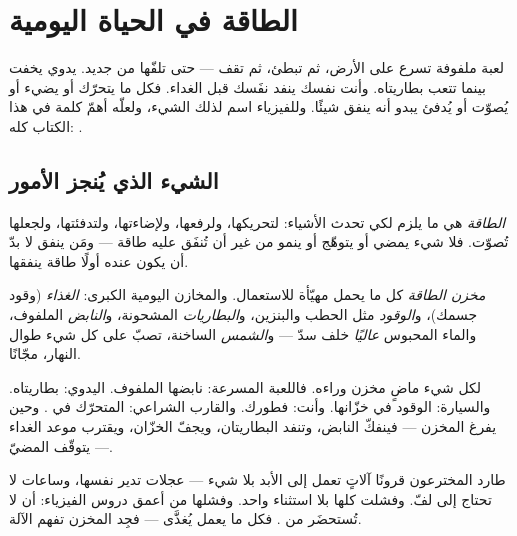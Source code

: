 \chapter{الطاقة في الحياة اليومية}\label{ch:g5:everyday-energy}

لعبة ملفوفة تسرع على الأرض، ثم تبطئ، ثم تقف --- حتى تلفّها من
جديد.  يدوي يخفت بينما تتعب بطاريتاه. وأنت نفسك ينفد نفَسك
قبل الغداء. فكل ما يتحرّك أو يضيء أو يُصوّت أو يُدفئ يبدو أنه
ينفق شيئًا. وللفيزياء اسم لذلك الشيء، ولعلّه أهمّ كلمة في هذا
الكتاب كله: .

\section{الشيء الذي يُنجز الأمور}

\begin{definition}[الطاقة]\label{def:g5:everyday-energy:energy}
\emph{الطاقة} هي ما يلزم لكي تحدث الأشياء: لتحريكها،
ولرفعها، ولإضاءتها، ولتدفئتها، ولجعلها تُصوّت. فلا شيء يمضي أو
يتوهّج أو ينمو من غير أن تُنفَق عليه طاقة --- ومَن ينفق لا بدّ
أن يكون عنده أولًا طاقة ينفقها.
\end{definition}

\begin{definition}\label{def:g5:everyday-energy:store}
\emph{مخزن الطاقة} كل ما يحمل  مهيّأة
للاستعمال. والمخازن اليومية الكبرى: \emph{الغذاء} (وقود جسمك)،
و\emph{الوقود} مثل الحطب والبنزين، و\emph{البطاريات} المشحونة،
و\emph{النابض} الملفوف، والماء المحبوس \emph{عاليًا} خلف سدّ ---
و\emph{الشمس} الساخنة، تصبّ  على كل شيء طوال النهار،
مجّانًا.
\end{definition}

\begin{example}\label{ex:g5:everyday-energy:spot}
لكل شيء ماضٍ مخزن وراءه. فاللعبة المسرعة: نابضها الملفوف.
 اليدوي: بطاريتاه. والسيارة: الوقود في خزّانها. وأنت:
فطورك. والقارب الشراعي:  المتحرّك في . وحين يفرغ
المخزن --- فينفكّ النابض، وتنفد البطاريتان، ويجفّ الخزّان،
ويقترب موعد الغداء --- يتوقّف المضيّ.
\end{example}

\begin{remark}\label{rem:g5:everyday-energy:nofree}
طارد المخترعون قرونًا آلاتٍ تعمل إلى الأبد بلا شيء --- عجلات
تدير نفسها، وساعات لا تحتاج إلى لفّ. وفشلت كلها بلا استثناء
واحد. وفشلها من أعمق دروس الفيزياء: أن  لا تُستحضَر من
. فكل ما يعمل يُغذَّى --- فجِد المخزن تفهم الآلة.
\end{remark}

